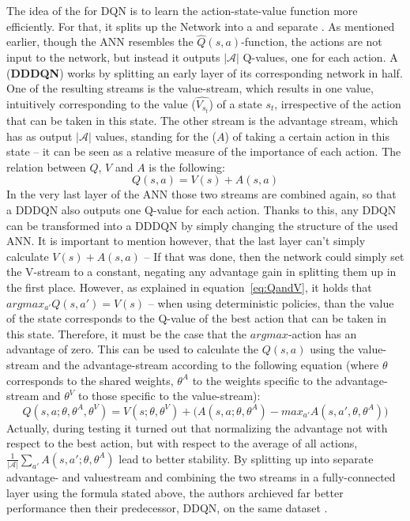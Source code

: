 The idea of the \cite{wang_dueling_2015} for DQN is to learn the action-state-value function more efficiently. For that, it splits up the Network into a  and separate . As mentioned earlier, though the ANN resembles the $\hat{Q}(s,a)$-function, the actions are not input to the network, but instead it outputs $|\mathcal{A}|$ Q-values, one for each action. A  (\textbf{DDDQN}) works by splitting an early layer of its corresponding network in half. One of the resulting streams is the value-stream, which results in one value, intuitively corresponding to the value ($\hat{V_{s_t}}$) of a state $s_t$, irrespective of the action that can be taken in this state. The other stream is  the advantage stream, which has as output $|\mathcal{A}|$ values, standing for the  ($A$) of taking a certain action in this state -- it can be seen as a relative measure of the importance of each action. The relation between $Q$, $V$ and $A$ is the following:
\begin{equation*}
	Q(s,a) = V(s) + A(s,a)
\end{equation*}
In the very last layer of the ANN those two streams are combined again, so that a DDDQN also outputs one Q-value for each action. Thanks to this, any DDQN can be transformed into a DDDQN by simply changing the structure of the used ANN. It is important to mention however, that the last layer can't simply calculate $V(s) + A(s,a)$ -- If that was done, then the network could simply set the V-stream to a constant, negating any advantage gain in splitting them up in the first place. However, as explained in equation~\ref{eq:QandV}, it holds that $argmax_{a'}Q(s,a') = V(s)$ -- when using deterministic policies, than the value of the state corresponds to the Q-value of the best action that can be taken in this state. Therefore, it must be the case that the $argmax$-action has an advantage of zero. This can be used to calculate the $Q(s,a)$ using the value-stream and the advantage-stream according to the following equation (where $\theta$ corresponds to the shared weights, $\theta^A$ to the weights specific to the advantage-stream and $\theta^V$ to those specific to the value-stream):
\begin{equation*}
	Q(s,a; \theta, \theta^A, \theta^V) = V(s; \theta, \theta^V) + \big( A(s,a; \theta, \theta^A) - max_{a'}A(s,a',\theta, \theta^A) \big)
\end{equation*}
Actually, during testing it turned out that normalizing the advantage not with respect to the best action, but with respect to the average of all actions, $\frac{1}{|\mathcal{A}|} \sum_{a'} A(s, a'; \theta, \theta^A)$ lead to better stability. By splitting up into separate advantage- and valuestream and combining the two streams in a fully-connected layer using the formula stated above, the authors archieved far better performance then their predecessor, DDQN, on the same dataset \cite{wang_dueling_2015}.\\

